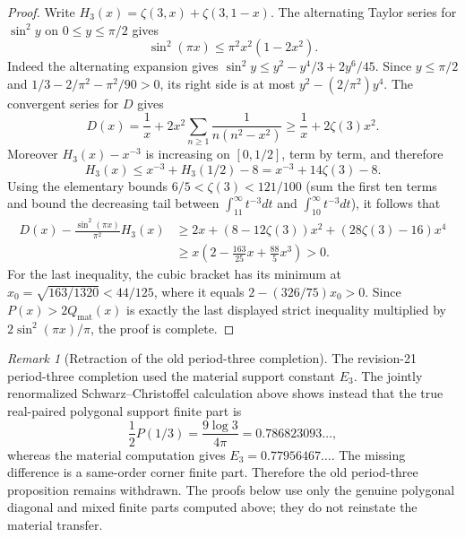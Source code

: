 \documentclass[11pt]{amsart}
\numberwithin{equation}{section}
\theoremstyle{definition}
\theoremstyle{remark}
\newtheorem{remark}[theorem]{Remark}
\begin{document}
\begin{proof}
Write $H_3(x)=\zeta(3,x)+\zeta(3,1-x)$.  The alternating Taylor
series for $\sin^2y$ on $0\le y\le\pi/2$ gives
\[
 \sin^2(\pi x)\le \pi^2x^2(1-2x^2).
\]
Indeed the alternating expansion gives
$\sin^2y\le y^2-y^4/3+2y^6/45$.  Since $y\le\pi/2$ and
$1/3-2/\pi^2-\pi^2/90>0$, its right side is at most
$y^2-(2/\pi^2)y^4$.  The convergent series for $D$ gives
\[
 D(x)=\frac1x+2x^2\sum_{n\ge1}\frac1{n(n^2-x^2)}
 \ge\frac1x+2\zeta(3)x^2.
\]
Moreover $H_3(x)-x^{-3}$ is increasing on $[0,1/2]$, term by term, and
therefore
\[
 H_3(x)\le x^{-3}+H_3(1/2)-8
 =x^{-3}+14\zeta(3)-8.
\]
Using the elementary bounds $6/5<\zeta(3)<121/100$ (sum the first ten
terms and bound the decreasing tail between
$\int_{11}^\infty t^{-3}dt$ and $\int_{10}^\infty t^{-3}dt$), it follows that
\begin{align*}
 D(x)-\frac{\sin^2(\pi x)}{\pi^2}H_3(x)
 &\ge 2x+(8-12\zeta(3))x^2+(28\zeta(3)-16)x^4\\
 &\ge x\left(2-\frac{163}{25}x+\frac{88}{5}x^3\right)>0.
\end{align*}
For the last inequality, the cubic bracket has its minimum at
$x_0=\sqrt{163/1320}<44/125$, where it equals
$2-(326/75)x_0>0$.  Since
$P(x)>2Q_{\mathrm{mat}}(x)$ is exactly the last displayed strict
inequality multiplied by $2\sin^2(\pi x)/\pi$, the proof is complete.
\end{proof}

\begin{remark}[Retraction of the old period-three completion]
\label{JC:rem:period-three-completion-retracted}
The revision-21 period-three completion used the material support constant
$E_3$.  The jointly renormalized Schwarz--Christoffel calculation above
shows instead that the true real-paired polygonal support finite part is
\[
 \frac12P(1/3)=\frac{9\log3}{4\pi}=0.786823093\ldots,
\]
whereas the material computation gives $E_3=0.77956467\ldots$.  The
missing difference is a same-order corner finite part.  Therefore the old
period-three proposition remains withdrawn.  The proofs below use only
the genuine polygonal diagonal and mixed finite parts computed above; they
do not reinstate the material transfer.
\end{remark}
\end{document}
